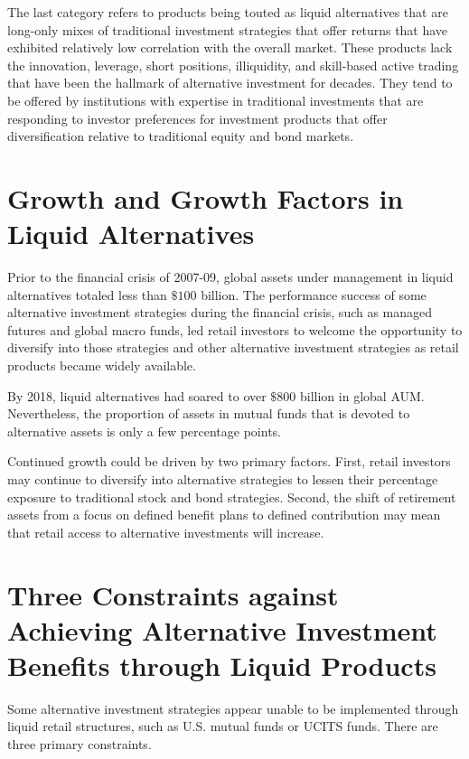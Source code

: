 \documentclass[11pt]{article}
\begin{document}
The last category refers to products being touted as liquid alternatives that are long-only mixes of traditional investment strategies that offer returns that have exhibited relatively low correlation with the overall market. These products lack the innovation, leverage, short positions, illiquidity, and skill-based active trading that have been the hallmark of alternative investment for decades. They tend to be offered by institutions with expertise in traditional investments that are responding to investor preferences for investment products that offer diversification relative to traditional equity and bond markets.

\section*{Growth and Growth Factors in Liquid Alternatives}
Prior to the financial crisis of 2007-09, global assets under management in liquid alternatives totaled less than $\$ 100$ billion. The performance success of some alternative investment strategies during the financial crisis, such as managed futures and global macro funds, led retail investors to welcome the opportunity to diversify into those strategies and other alternative investment strategies as retail products became widely available.

By 2018, liquid alternatives had soared to over $\$ 800$ billion in global AUM. Nevertheless, the proportion of assets in mutual funds that is devoted to alternative assets is only a few percentage points.

Continued growth could be driven by two primary factors. First, retail investors may continue to diversify into alternative strategies to lessen their percentage exposure to traditional stock and bond strategies. Second, the shift of retirement assets from a focus on defined benefit plans to defined contribution may mean that retail access to alternative investments will increase.

\section*{Three Constraints against Achieving Alternative Investment Benefits through Liquid Products}
Some alternative investment strategies appear unable to be implemented through liquid retail structures, such as U.S. mutual funds or UCITS funds. There are three primary constraints.
\end{document}
